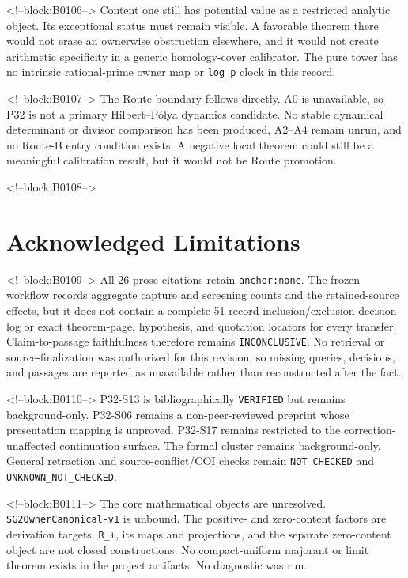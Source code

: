 \documentclass[11pt]{article}
\begin{document}
<!--block:B0106-->
Content one still has potential value as a restricted analytic object.
Its exceptional status must remain visible. A favorable theorem there
would not erase an ownerwise obstruction elsewhere, and it would not
create arithmetic specificity in a generic homology-cover calibrator.
The pure tower has no intrinsic rational-prime owner map or
\texttt{log\ p} clock in this record.

<!--block:B0107-->
The Route boundary follows directly. A0 is unavailable, so P32 is not a
primary Hilbert--Pólya dynamics candidate. No stable dynamical
determinant or divisor comparison has been produced, A2--A4 remain
unrun, and no Route-B entry condition exists. A negative local theorem
could still be a meaningful calibration result, but it would not be
Route promotion.

<!--block:B0108-->
\hypertarget{8-acknowledged-limitations}{%
\section{Acknowledged
Limitations}\label{8-acknowledged-limitations}}

<!--block:B0109-->
All 26 prose citations retain \texttt{anchor:none}. The frozen workflow
records aggregate capture and screening counts and the retained-source effects,
but it does not contain a complete 51-record inclusion/exclusion decision log
or exact theorem-page, hypothesis, and quotation locators for every transfer.
Claim-to-passage faithfulness therefore remains \texttt{INCONCLUSIVE}. No
retrieval or source-finalization was authorized for this revision, so missing
queries, decisions, and passages are reported as unavailable rather than
reconstructed after the fact.

<!--block:B0110-->
P32-S13 is bibliographically \texttt{VERIFIED} but remains background-only. P32-S06 remains
a non-peer-reviewed preprint whose presentation mapping is unproved.
P32-S17 remains restricted to the correction-unaffected continuation
surface. The formal cluster remains background-only. General retraction
and source-conflict/COI checks remain \texttt{NOT\_CHECKED} and
\texttt{UNKNOWN\_NOT\_CHECKED}.

<!--block:B0111-->
The core mathematical objects are unresolved.
\texttt{SG2OwnerCanonical-v1} is unbound. The positive- and zero-content
factors are derivation targets. \texttt{R\_+}, its maps and projections,
and the separate zero-content object are not closed constructions. No
compact-uniform majorant or limit theorem exists in the project
artifacts. No diagnostic was run.
\end{document}
